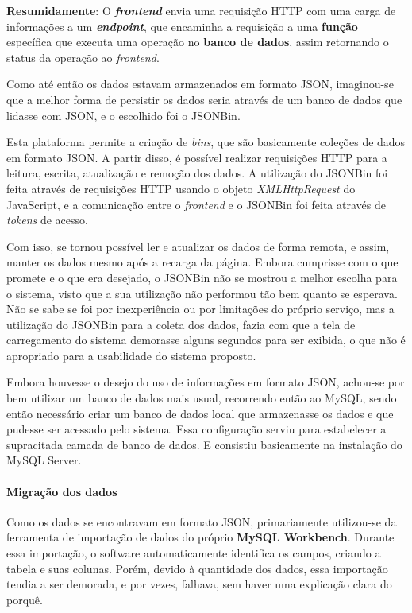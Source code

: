 \textbf{Resumidamente}: O \textbf{\textit{frontend}} envia uma requisição HTTP com uma carga de informações a um \textbf{\textit{endpoint}}, que encaminha a requisição a uma \textbf{função} específica que executa uma operação no \textbf{banco de dados}, assim retornando o status da operação ao \textit{frontend}.


Como até então os dados estavam armazenados em formato JSON, imaginou-se que a melhor forma de persistir os dados seria através de um banco de dados que lidasse com JSON, e o escolhido foi o JSONBin.

Esta plataforma permite a criação de \textit{bins}, que são basicamente coleções de dados em formato JSON. A partir disso, é possível realizar requisições HTTP para a leitura, escrita, atualização e remoção dos dados. A utilização do JSONBin foi feita através de requisições HTTP usando o objeto \textit{XMLHttpRequest} do JavaScript, e a comunicação entre o \textit{frontend} e o JSONBin foi feita através de \textit{tokens} de acesso.

Com isso, se tornou possível ler e atualizar os dados de forma remota, e assim, manter os dados mesmo após a recarga da página. Embora cumprisse com o que promete e o que era desejado, o JSONBin não se mostrou a melhor escolha para o sistema, visto que a sua utilização não performou tão bem quanto se esperava. Não se sabe se foi por inexperiência ou por limitações do próprio serviço, mas a utilização do JSONBin para a coleta dos dados, fazia com que a tela de carregamento do sistema demorasse alguns segundos para ser exibida, o que não é apropriado para a usabilidade do sistema proposto.


Embora houvesse o desejo do uso de informações em formato JSON, achou-se por bem utilizar um banco de dados mais usual, recorrendo então ao MySQL, sendo então necessário criar um banco de dados local que armazenasse os dados e que pudesse ser acessado pelo sistema. Essa configuração serviu para estabelecer a supracitada camada de banco de dados. E consistiu basicamente na instalação do MySQL Server.

\paragraph*{Migração dos dados}

Como os dados se encontravam em formato JSON, primariamente utilizou-se da ferramenta de importação de dados do próprio \textbf{MySQL Workbench}. Durante essa importação, o software automaticamente identifica os campos, criando a tabela e suas colunas. Porém, devido à quantidade dos dados, essa importação tendia a ser demorada, e por vezes, falhava, sem haver uma explicação clara do porquê.


